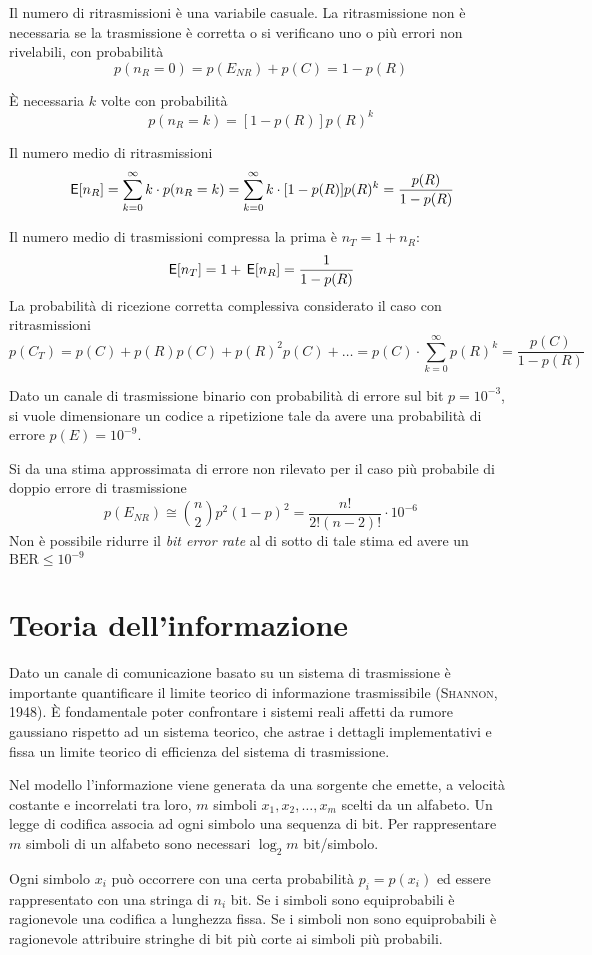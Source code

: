 Il numero di ritrasmissioni è una variabile casuale.
La ritrasmissione non è necessaria se la trasmissione è corretta o si verificano uno o più errori non rivelabili, con probabilità \[p(n_R=0)=p(E_{NR})+p(C)=1-p(R)\]

\`{E} necessaria $k$ volte con probabilità \[p(n_R=k)=[1-p(R)]p(R)^k\]

Il numero medio di ritrasmissioni
\[\,{\operatorname{\mathsf{E}}}\!\left[{n_R}\right]=\sum_{k=0}^{\infty}k\cdot p(n_R=k)=\sum_{k=0}^{\infty}k\cdot[1-p(R)]p(R)^k=\frac{p(R)}{1-p(R)}\]

Il numero medio di trasmissioni compressa la prima è $n_T=1+n_R$:
\[\,{\operatorname{\mathsf{E}}}\!\left[{n_T}\right]=1+\,{\operatorname{\mathsf{E}}}\!\left[{n_R}\right]=\frac{1}{1-p(R)}\]
La probabilità di ricezione corretta complessiva considerato il caso con ritrasmissioni
\[p(C_T)=p(C)+p(R)p(C)+p(R)^2p(C)+\dots=p(C)\cdot\sum_{k=0}^{\infty}p(R)^k=\frac{p(C)}{1-p(R)}\]

\begin{esempio}
Dato un canale di trasmissione binario con probabilità di errore sul bit $p=10^{-3}$, si vuole dimensionare un codice a ripetizione tale da avere una probabilità di errore $p(E)=10^{-9}$.

Si da una stima approssimata di errore non rilevato per il caso più probabile di doppio errore di trasmissione
\[p(E_{NR})\cong\binom{n}{2}p^2(1-p)^2=\frac{n!}{2!(n-2)!}\cdot 10^{-6}\]
Non è possibile ridurre il \emph{bit error rate} al di sotto di tale stima ed avere un $\text{BER}\leq 10^{-9}$ 
\end{esempio}

\section{Teoria dell'informazione}
Dato un canale di comunicazione basato su un sistema di trasmissione è importante quantificare il limite teorico di informazione trasmissibile (\textsc{Shannon}, 1948). \`{E} fondamentale poter confrontare i sistemi reali affetti da rumore gaussiano rispetto ad un sistema teorico, che astrae i dettagli implementativi e fissa un limite teorico di efficienza del sistema di trasmissione.

Nel modello l'informazione viene generata da una sorgente che emette, a velocità costante e incorrelati tra loro, $m$ simboli $x_1,x_2,\dots,x_m$ scelti da un alfabeto. Un legge di codifica associa ad ogni simbolo una sequenza di bit. Per rappresentare $m$ simboli di un alfabeto sono necessari $\log_2 m$ bit/simbolo.

Ogni simbolo $x_i$ può occorrere con una certa probabilità $p_i=p(x_i)$ ed essere rappresentato con una stringa di $n_i$ bit.
Se i simboli sono equiprobabili è ragionevole una codifica a lunghezza fissa. Se i simboli non sono equiprobabili è ragionevole attribuire stringhe di bit più corte ai simboli più probabili.

